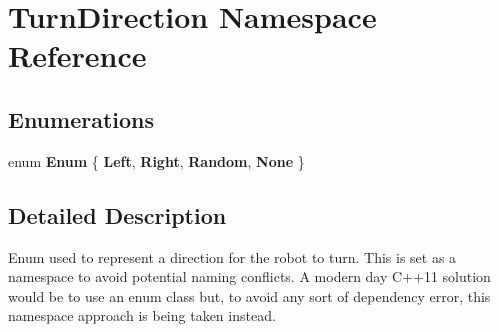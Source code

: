 \hypertarget{namespaceTurnDirection}{}\section{Turn\+Direction Namespace Reference}
\label{namespaceTurnDirection}
\subsection*{Enumerations}
\begin{DoxyCompactItemize}
\item 
\mbox{\label{namespaceTurnDirection_a7c0b5ea5feafc63211eb7be1c46eea67}} 
enum {\bfseries Enum} \{ {\bfseries Left}, 
{\bfseries Right}, 
{\bfseries Random}, 
{\bfseries None}
 \}
\end{DoxyCompactItemize}


\subsection{Detailed Description}
Enum used to represent a direction for the robot to turn. This is set as a namespace to avoid potential naming conflicts. A modern day C++11 solution would be to use an enum class but, to avoid any sort of dependency error, this namespace approach is being taken instead. 